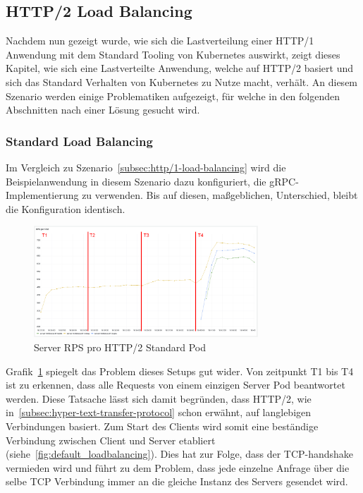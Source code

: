 \subsection{HTTP/2 Load Balancing}\label{subsec:http/2-load-balancing}

Nachdem nun gezeigt wurde, wie sich die Lastverteilung einer HTTP/1 Anwendung mit dem Standard Tooling von Kubernetes auswirkt, zeigt dieses Kapitel, wie sich eine Lastverteilte Anwendung, welche auf HTTP/2 basiert und sich das Standard Verhalten von Kubernetes zu Nutze macht, verhält.
An diesem Szenario werden einige Problematiken aufgezeigt, für welche in den folgenden Abschnitten nach einer Lösung gesucht wird.

\subsubsection{Standard Load Balancing}\label{subsubsec:standard}

Im Vergleich zu Szenario~\ref{subsec:http/1-load-balancing} wird die Beispielanwendung in diesem Szenario dazu konfiguriert, die gRPC-Implementierung zu verwenden.
Bis auf diesen, maßgeblichen, Unterschied, bleibt die Konfiguration identisch.

\begin{figure}[H]
    \centering
    \includegraphics[width=0.75\textwidth]{img/default_rps}
    \caption{Server RPS pro HTTP/2 Standard Pod}
    \label{fig:default_rps}
\end{figure}

Grafik~\ref{fig:default_rps} spiegelt das Problem dieses Setups gut wider.
Von zeitpunkt T1 bis T4 ist zu erkennen, dass alle Requests von einem einzigen Server Pod beantwortet werden.
Diese Tatsache lässt sich damit begründen, dass HTTP/2, wie in~\ref{subsec:hyper-text-transfer-protocol} schon erwähnt, auf langlebigen Verbindungen basiert.
Zum Start des Clients wird somit eine beständige Verbindung zwischen Client und Server etabliert (siehe~\ref{fig:default_loadbalancing}).
Dies hat zur Folge, dass der TCP-handshake vermieden wird und führt zu dem Problem, dass jede einzelne Anfrage über die selbe TCP Verbindung immer an die gleiche Instanz des Servers gesendet wird.

